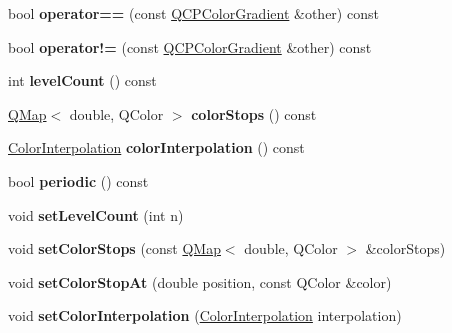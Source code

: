 \begin{DoxyCompactItemize}
bool {\bfseries operator==} (const \hyperlink{class_q_c_p_color_gradient}{Q\+C\+P\+Color\+Gradient} \&other) const
\item 
\mbox{\label{class_q_c_p_color_gradient_ad26a10e3beaef4fc6f2553d1a9756087}} 
bool {\bfseries operator!=} (const \hyperlink{class_q_c_p_color_gradient}{Q\+C\+P\+Color\+Gradient} \&other) const
\item 
\mbox{\label{class_q_c_p_color_gradient_ac4b9d7034fc3b6c76318b05075367090}} 
int {\bfseries level\+Count} () const
\item 
\mbox{\label{class_q_c_p_color_gradient_aaab19729e921682401044ac8e518ff02}} 
\hyperlink{class_q_map}{Q\+Map}$<$ double, Q\+Color $>$ {\bfseries color\+Stops} () const
\item 
\mbox{\label{class_q_c_p_color_gradient_abad5002858db8cf75ecb045200881de6}} 
\hyperlink{class_q_c_p_color_gradient_ac5dca17cc24336e6ca176610e7f77fc1}{Color\+Interpolation} {\bfseries color\+Interpolation} () const
\item 
\mbox{\label{class_q_c_p_color_gradient_a22a1d2b17f203caf0dcec833507fb9e0}} 
bool {\bfseries periodic} () const
\item 
\mbox{\label{class_q_c_p_color_gradient_a18da587eb4f7fc788ea28ba15b6a12de}} 
void {\bfseries set\+Level\+Count} (int n)
\item 
\mbox{\label{class_q_c_p_color_gradient_a724e828aa6f0ba5011a9392477c35d3a}} 
void {\bfseries set\+Color\+Stops} (const \hyperlink{class_q_map}{Q\+Map}$<$ double, Q\+Color $>$ \&color\+Stops)
\item 
\mbox{\label{class_q_c_p_color_gradient_a3b48be5e78079db1bb2a1188a4c3390e}} 
void {\bfseries set\+Color\+Stop\+At} (double position, const Q\+Color \&color)
\item 
\mbox{\label{class_q_c_p_color_gradient_aa13fda86406e1d896a465a409ae63b38}} 
void {\bfseries set\+Color\+Interpolation} (\hyperlink{class_q_c_p_color_gradient_ac5dca17cc24336e6ca176610e7f77fc1}{Color\+Interpolation} interpolation)

\end{DoxyCompactItemize}
